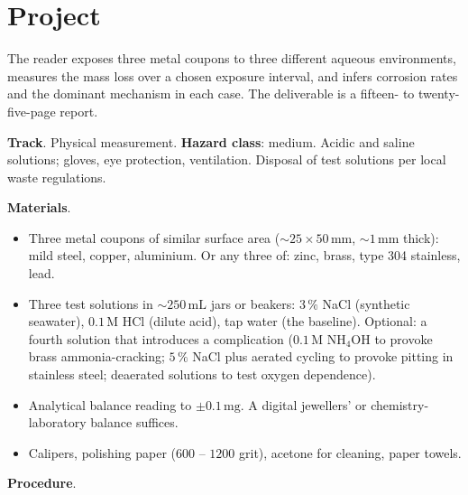 \section{Project}

\begin{project}
The reader exposes three metal coupons to three different aqueous
environments, measures the mass loss over a chosen exposure interval,
and infers corrosion rates and the dominant mechanism in each case.
The deliverable is a fifteen- to twenty-five-page report.

\textbf{Track}. Physical measurement.
\textbf{Hazard class}: medium. Acidic and saline solutions; gloves,
eye protection, ventilation. Disposal of test solutions per local
waste regulations.

\textbf{Materials}.

\begin{itemize}[leftmargin=*]
\item Three metal coupons of similar surface area
  ($\sim 25 \times 50\,\text{mm}$, $\sim 1\,\text{mm}$ thick):
  mild steel, copper, aluminium. Or any three of: zinc, brass, type
  304 stainless, lead.
\item Three test solutions in $\sim 250\,\text{mL}$ jars or beakers:
  $3\,\%$ NaCl (synthetic seawater), $0.1\,\text{M}$ HCl (dilute
  acid), tap water (the baseline). Optional: a fourth solution that
  introduces a complication ($0.1\,\text{M}$ NH$_4$OH to provoke
  brass ammonia-cracking; $5\,\%$ NaCl plus aerated cycling to
  provoke pitting in stainless steel; deaerated solutions to test
  oxygen dependence).
\item Analytical balance reading to $\pm 0.1\,\text{mg}$. A digital
  jewellers' or chemistry-laboratory balance suffices.
\item Calipers, polishing paper ($600$ -- $1200$ grit), acetone for
  cleaning, paper towels.
\end{itemize}

\textbf{Procedure}.


\end{project}
